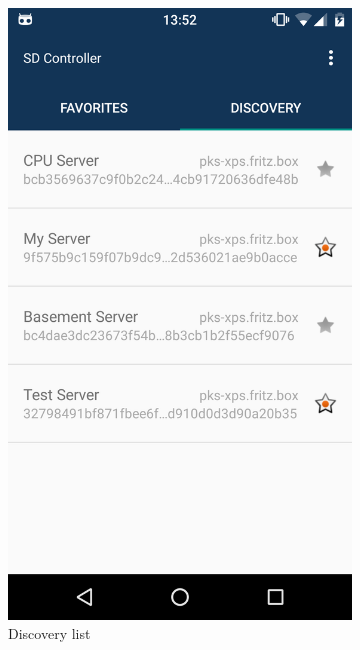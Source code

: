 \begin{figure}
\begin{subfigure}{0.24\textwidth}
        \includegraphics[width=\linewidth]{resources/discovery-list.png}
        \caption{Discovery list}
        \label{discovery-list}
    \end{subfigure}
    \begin{subfigure}{0.24\textwidth}

\end{subfigure}
\end{figure}
